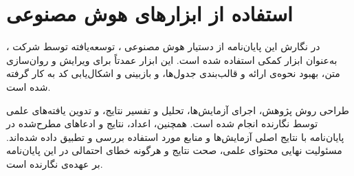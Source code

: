 \clearpage
{}
{}

\chapter*{استفاده از ابزارهای هوش مصنوعی}

در نگارش این پایان‌نامه از دستیار هوش مصنوعی ، توسعه‌یافته توسط شرکت ، به‌عنوان ابزار کمکی استفاده شده است. این ابزار عمدتاً برای ویرایش و روان‌سازی متن، بهبود نحوه‌ی ارائه و قالب‌بندی جدول‌ها، و بازبینی و اشکال‌یابی کد به کار گرفته شده است.

طراحی روش پژوهش، اجرای آزمایش‌ها، تحلیل و تفسیر نتایج، و تدوین یافته‌های علمی توسط نگارنده انجام شده است. همچنین، اعداد، نتایج و ادعاهای مطرح‌شده در پایان‌نامه با نتایج اصلی آزمایش‌ها و منابع مورد استفاده بررسی و تطبیق داده شده‌اند. مسئولیت نهایی محتوای علمی، صحت نتایج و هرگونه خطای احتمالی در این پایان‌نامه بر عهده‌ی نگارنده است.
